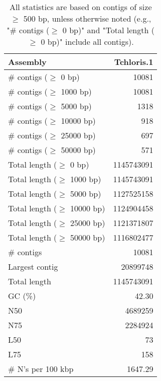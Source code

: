 \documentclass[12pt,a4paper]{article}
\begin{document}
\begin{table}[ht]
\begin{center}
\caption{All statistics are based on contigs of size $\geq$ 500 bp, unless otherwise noted (e.g., "\# contigs ($\geq$ 0 bp)" and "Total length ($\geq$ 0 bp)" include all contigs).}
\begin{tabular}{|l*{1}{|r}|}
\hline
Assembly & Tchloris.1 \\ \hline
\# contigs ($\geq$ 0 bp) & 10081 \\ \hline
\# contigs ($\geq$ 1000 bp) & 10081 \\ \hline
\# contigs ($\geq$ 5000 bp) & 1318 \\ \hline
\# contigs ($\geq$ 10000 bp) & 918 \\ \hline
\# contigs ($\geq$ 25000 bp) & 697 \\ \hline
\# contigs ($\geq$ 50000 bp) & 571 \\ \hline
Total length ($\geq$ 0 bp) & 1145743091 \\ \hline
Total length ($\geq$ 1000 bp) & 1145743091 \\ \hline
Total length ($\geq$ 5000 bp) & 1127525158 \\ \hline
Total length ($\geq$ 10000 bp) & 1124904458 \\ \hline
Total length ($\geq$ 25000 bp) & 1121371807 \\ \hline
Total length ($\geq$ 50000 bp) & 1116802477 \\ \hline
\# contigs & 10081 \\ \hline
Largest contig & 20899748 \\ \hline
Total length & 1145743091 \\ \hline
GC (\%) & 42.30 \\ \hline
N50 & 4689259 \\ \hline
N75 & 2284924 \\ \hline
L50 & 73 \\ \hline
L75 & 158 \\ \hline
\# N's per 100 kbp & 1647.29 \\ \hline
\end{tabular}
\end{center}
\end{table}
\end{document}
